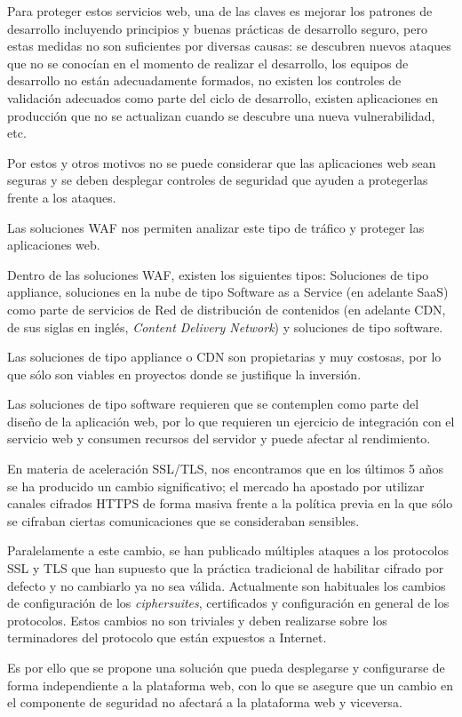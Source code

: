 \par Para proteger estos servicios web, una de las claves es mejorar los patrones de desarrollo incluyendo principios
y buenas prácticas de desarrollo seguro, pero estas medidas no son suficientes por diversas causas: se descubren
nuevos ataques que no se conocían en el momento de realizar el desarrollo, los equipos de desarrollo no están
adecuadamente formados, no existen los controles de validación adecuados como parte del ciclo de desarrollo, existen
aplicaciones en producción que no se actualizan cuando se descubre una nueva vulnerabilidad, etc.
\par Por estos y otros motivos no se puede considerar que las aplicaciones web sean seguras y se deben desplegar
controles de seguridad que ayuden a protegerlas frente a los ataques.
\par Las soluciones WAF nos permiten analizar este tipo de tráfico y proteger las aplicaciones web.
\par Dentro de las soluciones WAF, existen los siguientes tipos: Soluciones de tipo appliance, soluciones en la nube
de tipo Software as a Service (en adelante SaaS) como parte de servicios de Red de dis\-tri\-bu\-ción de contenidos (en adelante CDN, de sus siglas en inglés, {\em Content Delivery Network}) y soluciones de tipo software.
\par Las soluciones de tipo appliance o CDN son propietarias y muy costosas, por lo que sólo son viables en proyectos
donde se justifique la inversión.
\par Las soluciones de tipo software requieren que se contemplen como parte del diseño de la aplicación web, por lo
que requieren un ejercicio de integración con el servicio web y consumen recursos del servidor y puede afectar al
rendimiento.
\par En materia de aceleración SSL/TLS, nos encontramos que en los últimos 5 años se ha producido un cambio
significativo; el mercado ha apostado por utilizar canales cifrados HTTPS de forma masiva frente a la política previa
en la que sólo se cifraban ciertas comunicaciones que se consideraban sensibles.
\par Paralelamente a este cambio, se han publicado múltiples ataques a los protocolos SSL y TLS que han supuesto que
la práctica tradicional de habilitar cifrado por defecto y no cambiarlo ya no sea válida. Actualmente son habituales
los cambios de configuración de los {\em ciphersuites}, certificados y configuración en general de los protocolos.
Estos cambios no son triviales y deben realizarse sobre los terminadores del protocolo que están expuestos a
Internet.
\par Es por ello que se propone una solución que pueda desplegarse y configurarse de forma in\-de\-pen\-dien\-te a la
plataforma web, con lo que se asegure que un cambio en el componente de seguridad no afectará a la plataforma web y
viceversa.


